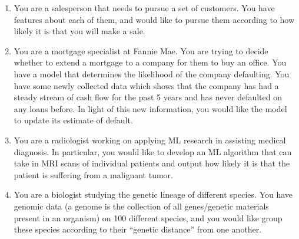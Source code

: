 \documentclass{exam}
\begin{document}
\begin{enumerate}
    \item You are a salesperson that needs to pursue a set of customers. You have features about each of them, and would like to pursue them according to how likely it is that you will make a sale.
    \item You are a mortgage specialist at Fannie Mae. You are trying to decide whether to extend a mortgage to a company for them to buy an office. You have a model that determines the likelihood of the company defaulting. You have some newly collected data which shows that the company has had a steady stream of cash flow for the past 5 years and has never defaulted on any loans before. In light of this new information, you would like the model to update its estimate of default. 
    \item You are a radiologist working on applying ML research in assisting medical diagnosis. In particular, you would like to develop an ML algorithm that can take in MRI scans of individual patients and output how likely it is that the patient is suffering from a malignant tumor. 
    \item You are a biologist studying the genetic lineage of different species. You have genomic data (a genome is the collection of all genes/genetic materials present in an organism) on 100 different species, and you would like group these species according to their ``genetic distance'' from one another. 
\end{enumerate}
\end{document}
